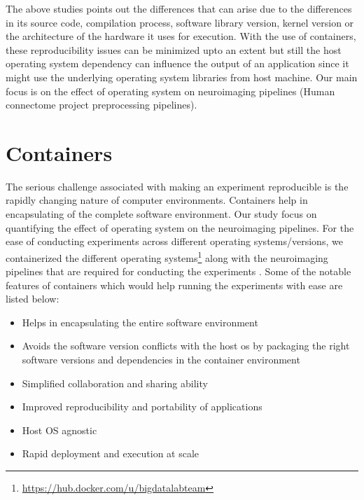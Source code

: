 The above studies points out the differences that can arise due to the differences in its source code, compilation process, software library version, kernel version or the architecture of the hardware it uses for execution. With the use of containers, these reproducibility issues can be minimized upto an extent but still the host operating system dependency can influence the output of an application since it might use the underlying operating system libraries from host machine. Our main focus is on the effect of operating system on neuroimaging pipelines (Human connectome project preprocessing pipelines). \\

\section{Containers}
The serious challenge associated with making an experiment reproducible is the rapidly changing nature of computer environments. Containers help in encapsulating of the complete software environment. Our study focus on quantifying the effect of operating system on the neuroimaging pipelines. For the ease of conducting experiments across different operating systems/versions, we containerized the different operating systems\footnote{\url{https://hub.docker.com/u/bigdatalabteam}} along with the neuroimaging pipelines that are required for conducting the experiments	. Some of the notable features of containers \cite{docker-run} \cite{DBLP:journals/corr/HaleLRW16} \cite{Julian:2016:CRI:2949550.2949562} \cite{10.1109/ISPASS.2015.7095802} which would help running the experiments with ease are listed below:

\begin{itemize}
  \item Helps in encapsulating the entire software environment
  \item Avoids the software version conflicts with the host os by packaging the right software versions and dependencies in the container environment
  \item Simplified collaboration and sharing ability
  \item Improved reproducibility and portability of applications
  \item Host OS agnostic
  \item Rapid deployment and execution at scale  
\end{itemize}

